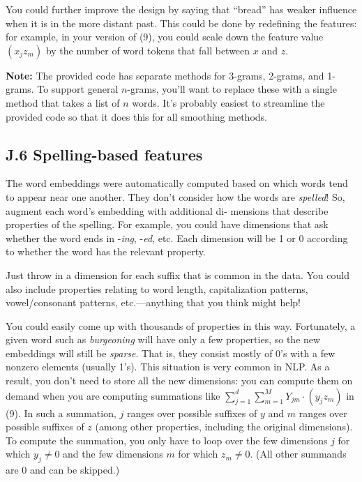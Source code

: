 You could further improve the design by saying that “bread” has weaker influence when it is in the more 
distant past. This could be done by redefining the features: for example, in your version of (9), you could 
scale down the feature value $(x_j z_m)$ by the number of word tokens that fall between $x$ and $z$.

\textbf{Note:} The provided code has separate methods for 3-grams, 2-grams, and 1-grams. To support general 
$n$-grams, you’ll want to replace these with a single method that takes a list of $n$ words. It’s probably easiest 
to streamline the provided code so that it does this for all smoothing methods. 

\subsection*{J.6 Spelling-based features}

The word embeddings were automatically computed based on which words tend to appear near one another. 
They don’t consider how the words are \emph{spelled}! So, augment each word’s embedding with additional di-
mensions that describe properties of the spelling. For example, you could have dimensions that ask whether 
the word ends in -\emph{ing}, -\emph{ed}, etc. Each dimension will be 1 or 0 according to whether the word has the 
relevant property. 

Just throw in a dimension for each suffix that is common in the data. You could also include properties 
relating to word length, capitalization patterns, vowel/consonant patterns, etc.—anything that you think 
might help! 

You could easily come up with thousands of properties in this way. Fortunately, a given word such as 
\emph{burgeoning} will have only a few properties, so the new embeddings will still be \emph{sparse}. That is, they consist 
mostly of 0’s with a few nonzero elements (usually 1’s). This situation is very common in NLP. As a result, 
you don’t need to store all the new dimensions: you can compute them on demand when you are computing 
summations like $\sum_{j=1}^d \sum_{m=1}^M Y_{jm}\cdot(y_j z_m)$ in (9). In such a summation, $j$ ranges over possible suffixes of 
$y$ and $m$ ranges over possible suffixes of $z$ (among other properties, including the original dimensions). To 
compute the summation, you only have to loop over the few dimensions $j$ for which $y_j \neq 0$ and the few 
dimensions $m$ for which $z_m \neq 0$. (All other summands are 0 and can be skipped.) 

